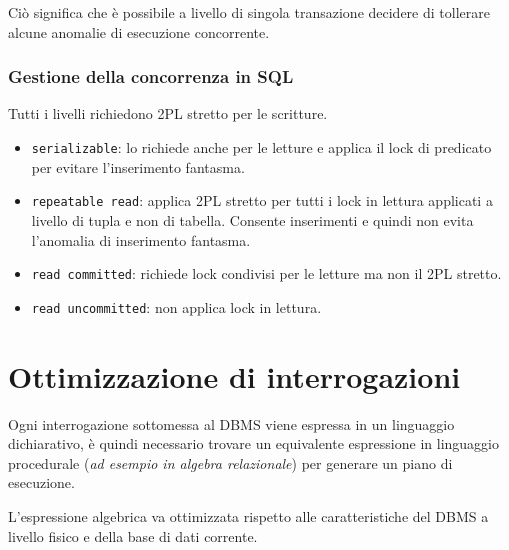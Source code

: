 \documentclass[oneside,a4paper,11pt]{book}
\theoremstyle{italicstyle}
\theoremstyle{normStyle}
\begin{document}
Ciò significa che è possibile a livello di singola transazione decidere di tollerare alcune 
anomalie di esecuzione concorrente.
\subsection{Gestione della concorrenza in SQL}
Tutti i livelli richiedono 2PL stretto per le scritture.
\begin{itemize}
  \item \verb|serializable|: lo richiede anche per le letture e applica 
  il lock di predicato per evitare l'inserimento fantasma.
  \item \verb|repeatable read|: applica 2PL stretto per tutti i lock in 
  lettura applicati a livello di tupla e non di tabella. Consente inserimenti 
  e quindi non evita l'anomalia di inserimento fantasma.
  \item \verb|read committed|: richiede lock condivisi per le letture ma non il
  2PL stretto.
  \item \verb|read uncommitted|: non applica lock in lettura.
\end{itemize}
\chapter{Ottimizzazione di interrogazioni}
Ogni interrogazione sottomessa al DBMS viene espressa in un linguaggio dichiarativo,
è quindi necessario trovare un equivalente espressione in linguaggio procedurale 
(\textit{ad esempio in algebra relazionale}) per generare un piano di esecuzione.

L'espressione algebrica va ottimizzata rispetto alle caratteristiche del DBMS a livello 
fisico e della base di dati corrente.
\end{document}
